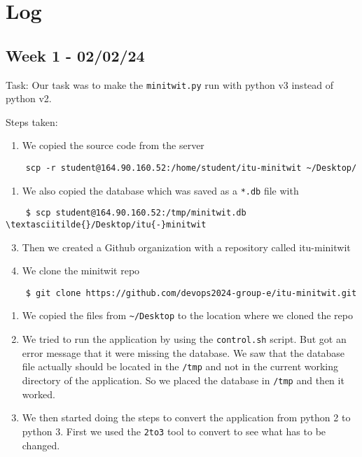 \section{Log}
\label{appendix_log}

\subsection{Week 1 - 02/02/24}
\label{log:week1}

Task: Our task was to make the \texttt{minitwit.py} run with python v3
instead of python v2.

Steps taken:

\begin{enumerate}
    \item We copied the source code from the server
\end{enumerate}

\begin{verbatim}
    scp -r student@164.90.160.52:/home/student/itu-minitwit ~/Desktop/
\end{verbatim}

\begin{enumerate}
    \item We also copied the database which was saved as a \texttt{*.db} file with
\end{enumerate}

\begin{verbatim}
    $ scp student@164.90.160.52:/tmp/minitwit.db \textasciitilde{}/Desktop/itu{-}minitwit
\end{verbatim}

\begin{enumerate}
    \setcounter{enumi}{2}
    \item Then we created a Github organization with a repository called itu-minitwit
    \item We clone the minitwit repo
\end{enumerate}

\begin{verbatim}
    $ git clone https://github.com/devops2024-group-e/itu-minitwit.git
\end{verbatim}

\begin{enumerate}
    \def\labelenumi{\arabic{enumi}.}
    \setcounter{enumi}{4}
    \item We copied the files from \texttt{\textasciitilde{}/Desktop} to the location where we cloned the repo
    \item We tried to run the application by using the \texttt{control.sh} script. But got an error message that it were missing the database. We saw that the database file actually should be located in the \texttt{/tmp} and not in the current working directory of the application. So we placed the database in \texttt{/tmp} and then it worked.
    \item We then started doing the steps to convert the application from python 2 to python 3. First we used the \texttt{2to3} tool to convert to see what has to be changed.
\end{enumerate}

